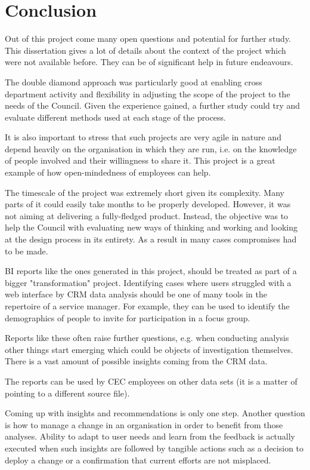 
\chapter{Conclusion}

Out of this project come many open questions and potential for further study. This dissertation gives a lot of details about the context of the project which were not available before. They can be of significant help in future endeavours.

The double diamond approach was particularly good at enabling cross department activity and flexibility in adjusting the scope of the project to the needs of the Council. Given the experience gained, a further study could try and evaluate different methods used at each stage of the process.

It is also important to stress that such projects are very agile in nature and depend heavily on the organisation in which they are run, i.e. on the knowledge of people involved and their willingness to share it. This project is a great example of how open-mindedness of employees can help.

The timescale of the project was extremely short given its complexity. Many parts of it could easily take months to be properly developed. However, it was not aiming at delivering a fully-fledged product. Instead, the objective was to help the Council with evaluating new ways of thinking and working and looking at the design process in its entirety. As a result in many cases compromises had to be made.

BI reports like the ones generated in this project, should be treated as part of a bigger "transformation" project. Identifying cases where users struggled with a web interface by CRM data analysis should be one of many tools in the repertoire of a service manager. For example, they can be used to identify the demographics of people to invite for participation in a focus group.

Reports like these often raise further questions, e.g. when conducting analysis other things start emerging which could be objects of investigation themselves. There is a vast amount of possible insights coming from the CRM data.

The reports can be used by CEC employees on other data sets (it is a matter of pointing to a different source file). 

Coming up with insights and recommendations is only one step. Another question is how to manage a change in an organisation in order to benefit from those analyses. Ability to adapt to user needs and learn from the feedback is actually executed when such insights are followed by tangible actions such as a decision to deploy a change or a confirmation that current efforts are not misplaced.